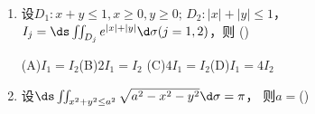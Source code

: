 \begin{enumerate}
  (A)$I_1<I_2<I_3$\quad(B)$I_1>I_2>I_3$\quad
  (C)$I_1<I_3<I_2$\quad(D)$I_3<I_1<I_2$
  \item 设$D_1:x+y\leq1,x\geq 0,y\geq0;\,D_2:|x|+|y|\leq1$，
  $I_j=\ds\iint_{D_j}e^{|x|+|y|}\d\sigma(j=1,2)$，则
  (\underline{\hspace{1cm}})
  
  (A)$I_1=I_2$\hspace{1cm}(B)$2I_1=I_2$\hspace{1cm}
  (C)$4I_1=I_2$\hspace{1cm}(D)$I_1=4I_2$
  \item 设$\ds\iint_{x^2+y^2\leq a^2}\sqrt{a^2-x^2-y^2}\d\sigma=\pi$，
  则$a=$(\underline{\hspace{1cm}})
  

\end{enumerate}
